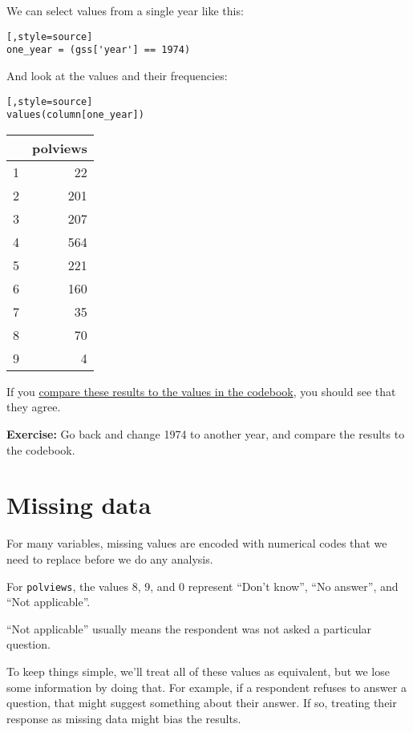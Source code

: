 We can select values from a single year like this:

\begin{lstlisting}[,style=source]
one_year = (gss['year'] == 1974)
\end{lstlisting}

And look at the values and their frequencies:

\begin{lstlisting}[,style=source]
values(column[one_year])
\end{lstlisting}

\begin{tabular}{lr}
\midrule
{} &  polviews \\
\midrule
1 &        22 \\
2 &       201 \\
3 &       207 \\
4 &       564 \\
5 &       221 \\
6 &       160 \\
7 &        35 \\
8 &        70 \\
9 &         4 \\
\midrule
\end{tabular}

If you
\href{https://gssdataexplorer.norc.org/projects/52787/variables/178/vshow}{compare
these results to the values in the codebook}, you should see that they
agree.

\textbf{Exercise:} Go back and change 1974 to another year, and compare
the results to the codebook.

\hypertarget{missing-data}{%
\section{Missing data}\label{missing-data}}

For many variables, missing values are encoded with numerical codes that
we need to replace before we do any analysis.

For \passthrough{\lstinline!polviews!}, the values 8, 9, and 0 represent
``Don't know'', ``No answer'', and ``Not applicable''.

``Not applicable'' usually means the respondent was not asked a
particular question.

To keep things simple, we'll treat all of these values as equivalent,
but we lose some information by doing that. For example, if a respondent
refuses to answer a question, that might suggest something about their
answer. If so, treating their response as missing data might bias the
results.

